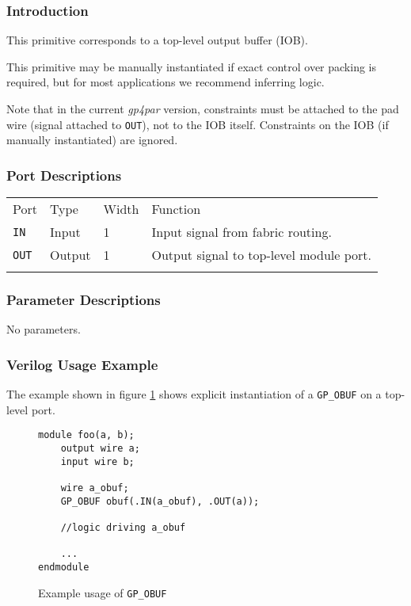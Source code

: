 \documentclass[11pt]{article}
\newcommand{\namestyle}[1]{\textit{#1}}
\newcommand{\tokenstyle}[1]{\texttt{#1}}
\newcommand{\whenstyle}[1]{{\fontseries{sb}\selectfont#1}}
\newcommand{\thinhline}{\Xhline{1\arrayrulewidth}}
\newcommand{\thickhline}{\Xhline{2.5\arrayrulewidth}}
\begin{document}
\subsubsection{Introduction}
This primitive corresponds to a top-level output buffer (IOB).

This primitive may be manually instantiated if exact control over packing is required, but for most applications we
recommend inferring logic.

Note that in the current \namestyle{gp4par} version, constraints must be attached to the pad wire (signal attached to \tokenstyle{OUT}), not to the IOB itself. Constraints on the IOB (if manually instantiated) are ignored.

\subsubsection{Port Descriptions}

\begin{tabularx}{\textwidth}{lllX}
\thinhline
\whenstyle{Port} & \whenstyle{Type} & \whenstyle{Width} & \whenstyle{Function} \\
\thickhline
\tokenstyle{IN} & Input & 1 & Input signal from fabric routing. \\
\thinhline
\tokenstyle{OUT} & Output & 1 & Output signal to top-level module port. \\
\thinhline
\end{tabularx}

\subsubsection{Parameter Descriptions}

No parameters.

\subsubsection{Verilog Usage Example}

The example shown in figure \ref{gp-obuf-example} shows explicit instantiation of a \tokenstyle{GP\_OBUF} on a top-level port.

\begin{figure}[h]
\begin{lstlisting}
module foo(a, b);
	output wire a;
	input wire b;

	wire a_obuf;
	GP_OBUF obuf(.IN(a_obuf), .OUT(a));

	//logic driving a_obuf

	...
endmodule
\end{lstlisting}
\caption{Example usage of \tokenstyle{GP\_OBUF}}
\label{gp-obuf-example}
\end{figure}
\end{document}
